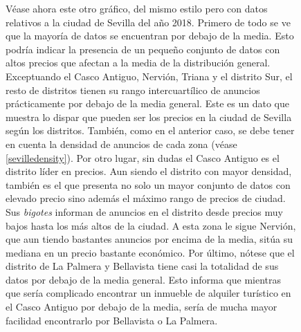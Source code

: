 \documentclass[a4paper,10pt]{article}
\begin{document}
\begin{figure}[ht]
                Véase ahora este otro gráfico, del mismo estilo pero con datos relativos a la ciudad de Sevilla del año 2018.
                Primero de todo se ve que la mayoría de datos se encuentran por debajo de la media. Esto podría indicar la presencia 
                de un pequeño conjunto de datos con altos precios que afectan a la media de la distribución general.
                Exceptuando el Casco Antiguo, Nervión, Triana y el distrito Sur, el resto de distritos tienen su rango intercuartílico de 
                anuncios prácticamente por debajo de la media general. Este es un dato que muestra lo dispar que pueden ser los precios
                en la ciudad de Sevilla según los distritos. También, como en el anterior caso, se debe tener en cuenta la densidad de anuncios
                de cada zona (véase \ref{sevilledensity}). 
                Por otro lugar, sin dudas el Casco Antiguo es el distrito líder en precios. Aun siendo el distrito con 
                mayor densidad, también es el que presenta no solo un mayor conjunto de datos con elevado precio sino además el máximo rango de precios de 
                ciudad. Sus \textit{bigotes} informan de anuncios en el distrito desde precios muy bajos hasta los más altos de la ciudad. 
                A esta zona le sigue Nervión, que aun tiendo bastantes anuncios por encima de la media, sitúa su mediana en un precio bastante económico.
                Por último, nótese que el distrito de La Palmera y Bellavista tiene casi la totalidad de sus datos por debajo de la media general. 
                Esto informa que mientras que sería complicado encontrar un inmueble de alquiler turístico en el Casco Antiguo por debajo de la media, 
                sería de mucha mayor facilidad encontrarlo por Bellavista o La Palmera. 

            \end{figure}

            \clearpage
\end{document}
